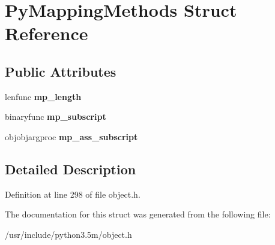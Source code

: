 \hypertarget{structPyMappingMethods}{}\section{Py\+Mapping\+Methods Struct Reference}
\label{structPyMappingMethods}
\subsection*{Public Attributes}
\begin{DoxyCompactItemize}
\item 
lenfunc {\bfseries mp\+\_\+length}\hypertarget{structPyMappingMethods_a7b02ebb6c6da74a7a12f5edddd43da8c}{}\label{structPyMappingMethods_a7b02ebb6c6da74a7a12f5edddd43da8c}

\item 
binaryfunc {\bfseries mp\+\_\+subscript}\hypertarget{structPyMappingMethods_acbf54a190e71b3ad665a1df1e26b1384}{}\label{structPyMappingMethods_acbf54a190e71b3ad665a1df1e26b1384}

\item 
objobjargproc {\bfseries mp\+\_\+ass\+\_\+subscript}\hypertarget{structPyMappingMethods_a8f2bf86d305c7d83a9c601204efa3841}{}\label{structPyMappingMethods_a8f2bf86d305c7d83a9c601204efa3841}

\end{DoxyCompactItemize}


\subsection{Detailed Description}


Definition at line 298 of file object.\+h.



The documentation for this struct was generated from the following file\+:\begin{DoxyCompactItemize}
\item 
/usr/include/python3.\+5m/object.\+h\end{DoxyCompactItemize}
